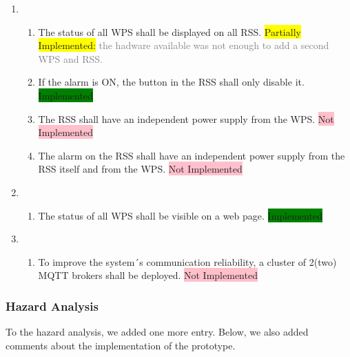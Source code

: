 \documentclass[11pt]{article}
\begin{document}
\begin{enumerate}[leftmargin=4em, font=\small, label=\textbf{SR-\arabic*}]
	\item
		\begin{enumerate}[leftmargin=1.5em, font=\small, label=\textbf{.\arabic*:}]
		\setlength\itemsep{0em}
		\item The status of all WPS shall be displayed on all RSS. \colorbox{yellow}{Partially Implemented:} \textcolor{gray}{the hadware available was not enough to add a second WPS and RSS.}
		\item If the alarm is ON, the button in the RSS shall only disable it. \colorbox{green}{Implemented}
		\item The RSS shall have an independent power supply from the WPS. \colorbox{pink}{Not Implemented}
		\item The alarm on the RSS shall have an independent power supply from the RSS itself and from the WPS. \colorbox{pink}{Not Implemented}
		\end{enumerate}
	
	\item	
		\begin{enumerate}[leftmargin=1.5em, font=\small, label=\textbf{.\arabic*:}]
		\setlength\itemsep{0em}
		\item The status of all WPS shall be visible on a web page. \colorbox{green}{Implemented}
		\end{enumerate}

	\item
		\begin{enumerate}[leftmargin=1.5em, font=\small, label=\textbf{.\arabic*:}]
		\setlength\itemsep{0em}
		\item To improve the system´s communication reliability, a cluster of 2(two) MQTT brokers shall be deployed. \colorbox{pink}{Not Implemented} 
		\end{enumerate}

\end{enumerate}

\subsubsection{Hazard Analysis}

To the hazard analysis, we added one more entry. Below, we also added comments about the implementation of the prototype.
\end{document}
